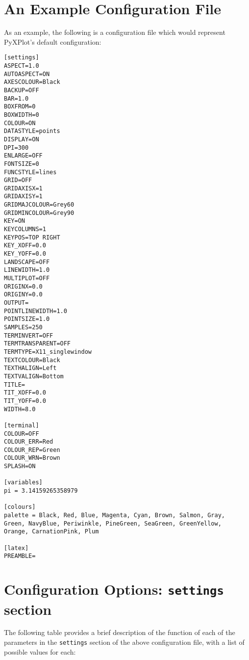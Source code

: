 \documentclass[a4paper,onecolumn,11pt]{book}
\begin{document}
\section{An Example Configuration File}
\noindent As an example, the following is a configuration file
which would represent PyXPlot's default configuration:

\begin{verbatim}
[settings]
ASPECT=1.0
AUTOASPECT=ON
AXESCOLOUR=Black
BACKUP=OFF
BAR=1.0
BOXFROM=0
BOXWIDTH=0
COLOUR=ON
DATASTYLE=points
DISPLAY=ON
DPI=300
ENLARGE=OFF
FONTSIZE=0
FUNCSTYLE=lines
GRID=OFF
GRIDAXISX=1
GRIDAXISY=1
GRIDMAJCOLOUR=Grey60
GRIDMINCOLOUR=Grey90
KEY=ON
KEYCOLUMNS=1
KEYPOS=TOP RIGHT
KEY_XOFF=0.0
KEY_YOFF=0.0
LANDSCAPE=OFF
LINEWIDTH=1.0
MULTIPLOT=OFF
ORIGINX=0.0
ORIGINY=0.0
OUTPUT=
POINTLINEWIDTH=1.0
POINTSIZE=1.0 
SAMPLES=250
TERMINVERT=OFF
TERMTRANSPARENT=OFF
TERMTYPE=X11_singlewindow
TEXTCOLOUR=Black
TEXTHALIGN=Left
TEXTVALIGN=Bottom
TITLE=
TIT_XOFF=0.0
TIT_YOFF=0.0
WIDTH=8.0

[terminal]
COLOUR=OFF
COLOUR_ERR=Red
COLOUR_REP=Green
COLOUR_WRN=Brown
SPLASH=ON

[variables]
pi = 3.14159265358979

[colours]
palette = Black, Red, Blue, Magenta, Cyan, Brown, Salmon, Gray,
Green, NavyBlue, Periwinkle, PineGreen, SeaGreen, GreenYellow,
Orange, CarnationPink, Plum

[latex]
PREAMBLE=
\end{verbatim}

\section{Configuration Options: \texttt{settings} section}
\label{configfile_settings}

The following table provides a brief description of the function of each of the
parameters in the \texttt{settings} section of the above configuration file,
with a list of possible values for each:
\end{document}
